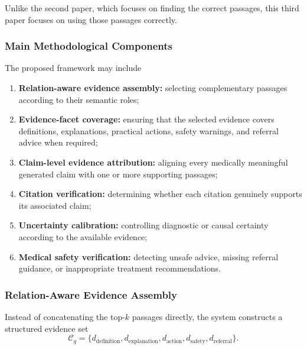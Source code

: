 \documentclass{article}
\begin{document}
Unlike the second paper, which focuses on finding the correct passages, this third paper focuses on using those passages correctly.

\subsubsection{Main Methodological Components}

The proposed framework may include
\begin{enumerate}
    \item \textbf{Relation-aware evidence assembly:} selecting complementary
    passages according to their semantic roles;

    \item \textbf{Evidence-facet coverage:} ensuring that the selected evidence covers definitions, explanations, practical actions, safety warnings, and referral advice when required;

    \item \textbf{Claim-level evidence attribution:} aligning every medically meaningful generated claim with one or more supporting passages;

    \item \textbf{Citation verification:} determining whether each citation genuinely supports its associated claim;

    \item \textbf{Uncertainty calibration:} controlling diagnostic or causal certainty according to the available evidence;

    \item \textbf{Medical safety verification:} detecting unsafe advice, missing referral guidance, or inappropriate treatment recommendations.
\end{enumerate}

\subsubsection{Relation-Aware Evidence Assembly}

Instead of concatenating the top-$k$ passages directly, the system constructs
a structured evidence set
\begin{equation}
    \mathcal{C}_q =
    \{
    d_{\mathrm{definition}},
    d_{\mathrm{explanation}},
    d_{\mathrm{action}},
    d_{\mathrm{safety}},
    d_{\mathrm{referral}}
    \}.
\end{equation}
\end{document}
